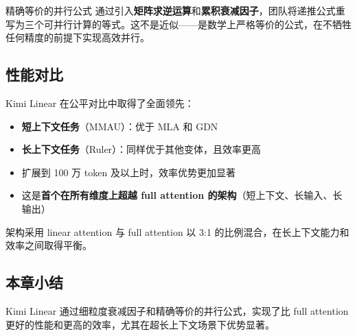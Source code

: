\begin{importantbox}{精确等价的并行公式}
通过引入\textbf{矩阵求逆运算}和\textbf{累积衰减因子}，团队将递推公式重写为三个可并行计算的等式。这不是近似——是数学上严格等价的公式，在不牺牲任何精度的前提下实现高效并行。
\end{importantbox}

\subsection{性能对比}

Kimi Linear 在公平对比中取得了全面领先：
\begin{itemize}
    \item \textbf{短上下文任务}（MMAU）：优于 MLA 和 GDN
    \item \textbf{长上下文任务}（Ruler）：同样优于其他变体，且效率更高
    \item 扩展到 100 万 token 及以上时，效率优势更加显著
    \item 这是\textbf{首个在所有维度上超越 full attention 的架构}（短上下文、长输入、长输出）
\end{itemize}

架构采用 linear attention 与 full attention 以 3:1 的比例混合，在长上下文能力和效率之间取得平衡。

\subsection{本章小结}

Kimi Linear 通过细粒度衰减因子和精确等价的并行公式，实现了比 full attention 更好的性能和更高的效率，尤其在超长上下文场景下优势显著。


